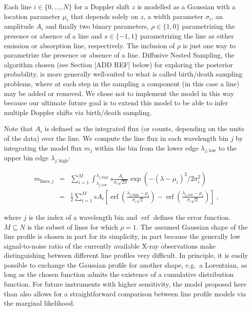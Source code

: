 \documentclass[12pt]{emulateapj}
\DeclareMathOperator\erf{erf}
\newcommand{\mean}{m}
\begin{document}
Each line $i \in \{0, ..., N\}$ for a Doppler shift $z$ is modelled as a Gaussian with a location parameter $\mu_{i}$ that depends solely on $z$, a width parameter $\sigma_{i}$, an amplitude $A_{i}$ and finally two binary parameters, $\rho \in \{1, 0\}$ parametrizing the presence or absence of a line and $s \in \{-1, 1\}$ parametrizing the line as either emission or absorption line, respectively. The inclusion of $\rho$ is just one way to parametrize the presence or absence of a line. Diffusive Nested Sampling, the algorithm chosen (see Section [ADD REF] below) for exploring the posterior probability, is more generally well-suited to what is called birth/death sampling problems, where at each step in the sampling a component (in this case a line) may be added or removed. We chose not to implement the model in this way because our ultimate future goal is to extend this model to be able to infer multiple Doppler shifts via birth/death sampling. 

Note that $A_{i}$ is defined as the integrated flux (or counts, depending on the units of the data) over the line. We compute the line flux in each wavelength bin $j$ by integrating the model flux $\mean_j$ within the bin from the lower edge $\lambda_{j, \mathrm{low}}$ to the upper bin edge $\lambda_{j, \mathrm{high}}$:

\begin{eqnarray}
\mean_{\mathrm{lines},j} & = &  \sum_{i=1}^{M}{\int^{ \lambda_{j,\mathrm{high}}}_{\lambda_{j, \mathrm{low}}}{s \frac{A_{i}}{\sigma_{i}\sqrt{2\pi}} \exp{(-(\lambda-\mu_{i})^2/{2\sigma_{i}^2})}}} \\ \nonumber
& = & \frac{1}{2} \sum_{i=1}^{M} s A_{i}   \left[ \erf{\left( \frac{\lambda_{j,\mathrm{high}} - \mu_{i}}{\sigma_{i}\sqrt{2}}\right)} - \erf{\left( \frac{\lambda_{j, \mathrm{low}} - \mu_{i}}{\sigma_{i}\sqrt{2}}\right)} \right] \; ,
\end{eqnarray}

\noindent where $j$ is the index of a wavelength bin and $\erf$ defines the error function. $M \subseteq N$ is the subset of lines for which $\rho = 1$. The assumed Gaussian shape of the line profile is chosen in part for its simplicity, in part because the generally low signal-to-noise ratio of the currently available X-ray observations make distinguishing between different line profiles very difficult. In principle, it is easily possible to exchange the Gaussian profile for another shape, e.g.\ a Lorentzian, as long as the chosen function admits the existence of a cumulative distribution function. For future instruments with higher sensitivity, the model proposed here than also allows for a straightforward comparison between line profile models via the marginal likelihood. 
\end{document}

